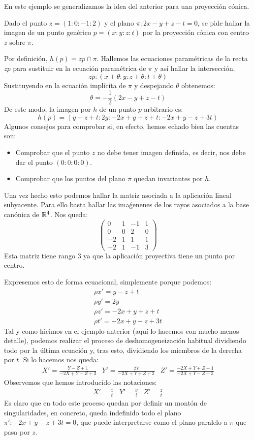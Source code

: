 En este ejemplo se generalizamos la idea del anterior para una proyección cónica.
\begin{exa}
	Dado el punto $z=(1:0:-1:2)$ y el plano $\pi:2x-y+z-t=0$, se pide hallar la imagen de un punto genérico $p=(x:y:z:t)$ por la proyección cónica con centro $z$ sobre $\pi$.
	
	Por definición, $h(p)=zp\cap\pi$. Hallemos las ecuaciones paramétricas de la recta $zp$ para sustituir en la ecuación paramétrica de $\pi$ y así hallar la intersección.
	\[zp:(x+\theta:y:z+\theta:t+\theta)\]
	Sustituyendo en la ecuación implícita de $\pi$ y despejando $\theta$ obtenemos:
	\[\theta=-\frac{1}{2}(2x-y+z-t)\]
	De este modo, la imagen por $h$ de un punto $p$ arbitrario es:
	\[h(p)=(y-z+t:2y:-2x+y+z+t:-2x+y-z+3t)\]
	Algunos consejos para comprobar si, en efecto, hemos echado bien las cuentas son:
	\begin{itemize}
		\item Comprobar que el punto $z$ no debe tener imagen definida, es decir, nos debe dar el punto $(0:0:0:0)$.
		\item Comprobar que los puntos del plano $\pi$ quedan invariantes por $h$.
	\end{itemize}
	Una vez hecho esto podemos hallar la matriz asociada a la aplicación lineal subyacente. Para ello basta hallar las imaǵenenes de los rayos asociados a la base canónica de $\mathbb{R}^4$. Nos queda:
	\[\begin{pmatrix}
	0 & 1 & -1 & 1\\
	0 & 0 & 2 & 0\\
	-2 & 1 & 1 & 1\\
	-2 & 1 & -1 & 3
	\end{pmatrix}\]
	Esta matriz tiene rango $3$ ya que la aplicación proyectiva tiene un punto por centro.
	
	Expresemos esto de forma ecuacional, simplemente porque podemos:
	\[
	\begin{array}{l}
		\rho x'= y-z+t\\
		\rho y'= 2y\\
		\rho z'= -2x+y+z+t\\
		\rho t'= -2x+y-z+3t
	\end{array}
	\]
	Tal y como hicimos en el ejemplo anterior (aquí lo hacemos con mucho menos detalle), podemos realizar el proceso de deshomogeneización habitual dividiendo todo por la última ecuación y, tras esto, dividiendo los miembros de la derecha por $t$. Si lo hacemos nos queda:
	\[
	\begin{array}{ccc}
	X'=\frac{Y-Z+1}{-2X+Y-Z+3} &
	Y'=\frac{2Y}{-2X+Y+Z+3} &
	Z'=\frac{-2X+Y+Z+1}{-2X+Y-Z+3}
	\end{array}
	\]
	Observemos que hemos introducido las notaciones:
	\[\begin{array}{ccc}
	X'=\frac{x}{t} & Y'=\frac{y}{t} & Z'=\frac{z}{t}
	\end{array}\]
	Es claro que en todo este proceso quedan por definir un montón de singularidades, en concreto, queda indefinido todo el plano $\pi':-2x+y-z+3t=0$, que puede interpretarse como el plano paralelo a $\pi$ que pasa por $z$.
\end{exa}
